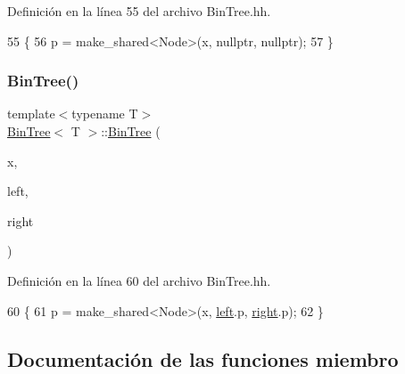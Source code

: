 Definición en la línea 55 del archivo Bin\+Tree.\+hh.


\begin{DoxyCode}
55                                   \{
56         p = make\_shared<Node>(x, \textcolor{keyword}{nullptr}, \textcolor{keyword}{nullptr});
57     \}
\end{DoxyCode}
\mbox{\label{class_bin_tree_adb7eeff76d08130c943b36af215eb521}} 
\subsubsection{\texorpdfstring{Bin\+Tree()}{BinTree()}\hspace{0.1cm}{\footnotesize\ttfamily [3/3]}}
{\footnotesize\ttfamily template$<$typename T$>$ \\
\mbox{\hyperlink{class_bin_tree}{Bin\+Tree}}$<$ T $>$\+::\mbox{\hyperlink{class_bin_tree}{Bin\+Tree}} (\begin{DoxyParamCaption}\item[{const T \&}]{x,  }\item[{const \mbox{\hyperlink{class_bin_tree}{Bin\+Tree}}$<$ T $>$ \&}]{left,  }\item[{const \mbox{\hyperlink{class_bin_tree}{Bin\+Tree}}$<$ T $>$ \&}]{right }\end{DoxyParamCaption})\hspace{0.3cm}{\ttfamily [explicit]}}



Definición en la línea 60 del archivo Bin\+Tree.\+hh.


\begin{DoxyCode}
60                                                                              \{
61         p = make\_shared<Node>(x, \mbox{\hyperlink{class_bin_tree_a82108db4c1b08d1f111027788c196d4e}{left}}.p, \mbox{\hyperlink{class_bin_tree_aff8e96651b27284c329667b5ad3e4d0b}{right}}.p);
62     \}
\end{DoxyCode}


\subsection{Documentación de las funciones miembro}
\mbox{\label{class_bin_tree_a74cda259ba5c25b8ee38ed4dc33e4fad}} 

